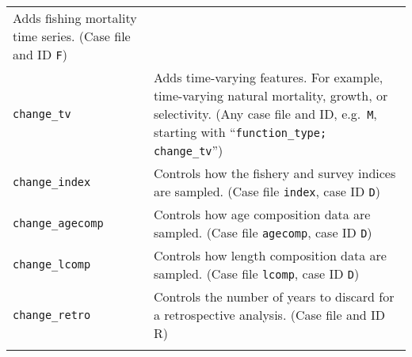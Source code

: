 \documentclass[10pt]{article}
\begin{document}
\begin{longtable}[c]{@{}ll@{}}
\begin{minipage}[t]{0.57\columnwidth}
Adds fishing mortality time series. (Case file and ID \texttt{F})
\end{minipage}
\\\noalign{\medskip}
\begin{minipage}[t]{0.32\columnwidth}\raggedright
\texttt{change\_tv}
\end{minipage} & \begin{minipage}[t]{0.57\columnwidth}\raggedright
Adds time-varying features. For example, time-varying natural mortality,
growth, or selectivity. (Any case file and ID, e.g.~\texttt{M}, starting with
``\texttt{function\_type; change\_tv}'')
\end{minipage}
\\\noalign{\medskip}
\begin{minipage}[t]{0.32\columnwidth}\raggedright
\texttt{change\_index}
\end{minipage} & \begin{minipage}[t]{0.57\columnwidth}\raggedright
Controls how the fishery and survey indices are sampled. (Case file
\texttt{index}, case ID \texttt{D})
\end{minipage}
\\\noalign{\medskip}
\begin{minipage}[t]{0.32\columnwidth}\raggedright
\texttt{change\_agecomp}
\end{minipage} & \begin{minipage}[t]{0.57\columnwidth}\raggedright
Controls how age composition data are sampled. (Case file \texttt{agecomp},
case ID \texttt{D})
\end{minipage}
\\\noalign{\medskip}
\begin{minipage}[t]{0.32\columnwidth}\raggedright
\texttt{change\_lcomp}
\end{minipage} & \begin{minipage}[t]{0.57\columnwidth}\raggedright
Controls how length composition data are sampled. (Case file \texttt{lcomp},
case ID \texttt{D})
\end{minipage}
\\\noalign{\medskip}
\begin{minipage}[t]{0.32\columnwidth}\raggedright
\texttt{change\_retro}
\end{minipage} & \begin{minipage}[t]{0.57\columnwidth}\raggedright
Controls the number of years to discard for a retrospective analysis. (Case
file and ID R)
\end{minipage}
\\\noalign{\medskip}

\end{longtable}
\end{document}
